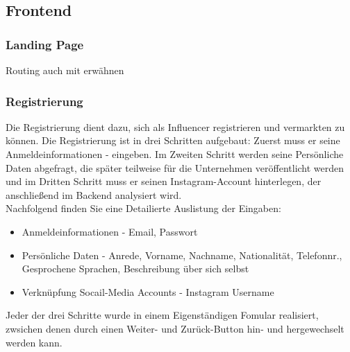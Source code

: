 \documentclass[conference,a4paper,flushend]{cs-techrep}
\begin{document}
\subsection{Frontend}

\subsubsection{Landing Page\\}
 Routing auch mit erwähnen

\subsubsection{Registrierung\\}
Die Registrierung dient dazu, sich als Influencer registrieren und vermarkten zu können. Die Registrierung ist in drei Schritten aufgebaut:
Zuerst muss er seine Anmeldeinformationen - eingeben. Im Zweiten Schritt werden seine Persönliche Daten abgefragt, die später teilweise für die Unternehmen veröffentlicht werden und im Dritten Schritt muss er seinen Instagram-Account hinterlegen, der anschließend im Backend analysiert wird.\\
Nachfolgend finden Sie eine Detailierte Auslistung der Eingaben:
\begin{itemize}
\item{Anmeldeinformationen - Email, Passwort}
\item{Persönliche Daten - Anrede, Vorname, Nachname, Nationalität, Telefonnr., Gesprochene Sprachen, Beschreibung über sich selbst}
\item{Verknüpfung Socail-Media Accounts - Instagram Username}
\end{itemize}
Jeder der drei Schritte wurde in einem Eigenständigen Fomular realisiert, zwsichen denen durch einen Weiter- und Zurück-Button hin- und hergewechselt werden kann.
\end{document}
